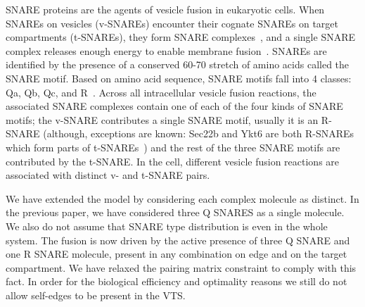 SNARE proteins are the agents of vesicle fusion in eukaryotic cells. When SNAREs on vesicles (v-SNAREs) encounter their cognate SNAREs on target compartments (t-SNAREs), they form SNARE complexes~\cite{jahn2006snares}, and a single SNARE complex releases enough energy to enable membrane fusion~\cite{van2010one}. SNAREs are identified by the presence of a conserved 60-70 stretch of amino acids called the SNARE motif. Based on amino acid sequence, SNARE motifs fall into 4 classes: Qa, Qb, Qc, and R~\cite{jahn2006snares}. Across all intracellular vesicle fusion reactions, the associated SNARE complexes contain one of each of the four kinds of SNARE motifs; the v-SNARE contributes a single SNARE motif, usually it is an R-SNARE (although, exceptions are known: Sec22b and Ykt6 are both R-SNAREs which form parts of t-SNAREs~\cite{hong2005snares}) and the rest of the three SNARE
motifs are contributed by the t-SNARE. In the cell, different vesicle fusion reactions are associated with distinct v- and t-SNARE pairs.

We have extended the model by considering each complex molecule as distinct. In the previous paper, we have considered three Q SNARES as a single molecule. We also do not assume that SNARE type distribution is even in the whole system. The fusion is now driven by the active presence of three Q SNARE and one R SNARE molecule, present in any combination on edge and on the target compartment. We have relaxed the pairing matrix constraint to comply with this fact. In order for the biological efficiency and optimality reasons we still do not allow self-edges to be present in the VTS. 


